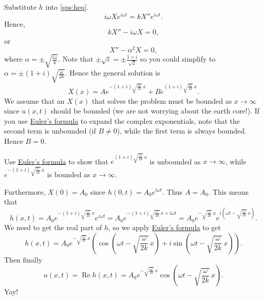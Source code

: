 Substitute $h$ into \eqref{sps:heq}.
\begin{equation*}
i\omega X e^{i\omega t} = k X'' e^{i \omega t} .
\end{equation*}
Hence,
\begin{equation*}
k X''  - i \omega X = 0 ,
\end{equation*}
or 
\begin{equation*}
X''  - \alpha^2 X = 0 ,
\end{equation*}
where $\alpha = \pm \sqrt{\frac{i\omega}{k}}$.  Note that $\pm \sqrt{i} = \pm
\frac{1+i}{\sqrt{2}}$ so you could simplify to
$\alpha = \pm (1+i)\sqrt{\frac{\omega}{2k}}$.
Hence the general solution is
\begin{equation*}
X(x) = A e^{-(1+i)\sqrt{\frac{\omega}{2k}} \, x}
+ B e^{(1+i)\sqrt{\frac{\omega}{2k}} \, x} .
\end{equation*}
We assume that an $X(x)$ that solves the problem must be bounded as $x \to
\infty$ since $u(x,t)$ should be bounded (we are not worrying about the earth
core!).
If you use \hyperref[eulersformula]{Euler's formula} to expand the complex exponentials, 
note that the second term is unbounded (if $B \not = 0$),
while the first term is always bounded.  Hence $B=0$.

\begin{exercise}
Use \hyperref[eulersformula]{Euler's formula} to show that
$e^{(1+i)\sqrt{\frac{\omega}{2k}} \, x}$ is unbounded as $x \to \infty$,
while $e^{-(1+i)\sqrt{\frac{\omega}{2k}} \, x}$ is bounded
as $x \to \infty$.
\end{exercise}

Furthermore, $X(0) = A_0$ since $h(0,t) = A_0 e^{i \omega t}$.
Thus $A=A_0$.  This means that
\begin{equation*}
h(x,t) = A_0 e^{-(1+i)\sqrt{\frac{\omega}{2k}} \, x} e^{i \omega t}
=
A_0 e^{-(1+i)\sqrt{\frac{\omega}{2k}} \, x + i \omega t}
=
A_0 e^{-\sqrt{\frac{\omega}{2k}} \, x}
e^{i(\omega t - \sqrt{\frac{\omega}{2k}} \, x)} .
\end{equation*}
We need to get the real part of $h$, so
we apply \hyperref[eulersformula]{Euler's formula} to get
\begin{equation*}
h(x,t) =
A_0 e^{-\sqrt{\frac{\omega}{2k}} \, x}
\left(\cos \left(\omega t - \sqrt{\frac{\omega}{2k}}\, x\right) + 
i \sin \left(\omega t - \sqrt{\frac{\omega}{2k}}\, x\right) \right) .
\end{equation*}
Then finally
\begin{equation*}
u(x,t) = \operatorname{Re} h(x,t) =
A_0 e^{-\sqrt{\frac{\omega}{2k}}\, x}
\cos \left(\omega t - \sqrt{\frac{\omega}{2k}}\, x\right) .
\end{equation*}
Yay!

